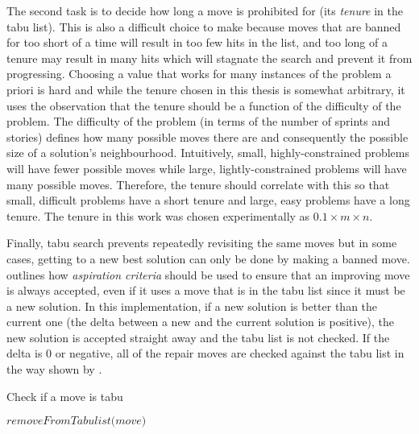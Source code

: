 The second task is to decide how long a move is prohibited for (its \textit{tenure} in the tabu list). This is also a difficult choice to make because moves that are banned for too short of a time will result in too few hits in the list, and too long of a tenure may result in many hits which will stagnate the search and prevent it from progressing. Choosing a value that works for many instances of the problem a priori is hard and while the tenure chosen in this thesis is somewhat arbitrary, it uses the observation that the tenure should be a function of the difficulty of the problem. The difficulty of the problem (in terms of the number of sprints and stories) defines how many possible moves there are and consequently the possible size of a solution's neighbourhood. Intuitively, small, highly-constrained problems will have fewer possible moves while large, lightly-constrained problems will have many possible moves. Therefore, the tenure should correlate with this so that small, difficult problems have a short tenure and large, easy problems have a long tenure. The tenure in this work was chosen experimentally as $0.1 \times m \times n$.

Finally, tabu search prevents repeatedly revisiting the same moves but in some cases, getting to a new best solution can only be done by making a banned move. \citet{glover1989tabu} outlines how \textit{aspiration criteria} should be used to ensure that an improving move is always accepted, even if it uses a move that is in the tabu list since it must be a new solution. In this implementation, if a new solution is better than the current one (the delta between a new and the current solution is positive), the new solution is accepted straight away and the tabu list is not checked. If the delta is 0 or negative, all of the repair moves are checked against the tabu list in the way shown by .

\begin{algorithm}[H]
\caption{Check if a move is tabu}\label{tabu_check}
\begin{algorithmic}[1]
                \State $\textit{removeFromTabulist(move)}$
                \State {}
            \Else{}
                \State {}
            \EndIf
        \Else{}
            \State {}
        \EndIf
    \EndProcedure
\end{algorithmic}
\end{algorithm}